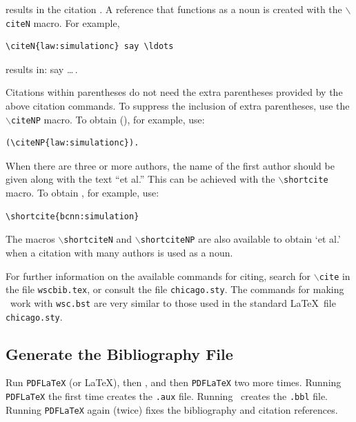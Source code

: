 \documentclass{article}
\begin{document}
\noindent results in the citation \cite{cheng:input94,law:simulationc}. A reference that functions as a noun is created with the {\tt $\backslash$citeN}
macro. For example,\newline


\begin{verbatim}
\citeN{law:simulationc} say \ldots
\end{verbatim}\vspace{5mm}

\noindent results in:  say \ldots\,.

Citations within parentheses do not need the extra parentheses provided by the above citation commands. To suppress the inclusion of extra parentheses, use the {\tt $\backslash$citeNP} macro. To obtain (), for example, use:\newline


\begin{verbatim}
(\citeNP{law:simulationc}).
\end{verbatim}\vspace{5mm}

When there are three or more authors, the name of the first author should be given along with the text ``et al.'' This can be achieved with the {\tt $\backslash$shortcite} macro. To obtain , for example, use: \newline


\begin{verbatim}
\shortcite{bcnn:simulation}
\end{verbatim}\vspace{5mm}

\noindent The macros {\tt $\backslash$shortciteN} and {\tt $\backslash$shortciteNP} are also available to obtain `et al.' when a citation with many authors is used as a noun.

For further information on the available commands for citing, search for {\tt $\backslash$cite} in the file {\tt wscbib.tex}, or consult the file {\tt chicago.sty}. The commands for making \BibTeX\ work with {\tt wsc.bst} are very similar to those used in the standard \LaTeX\ file {\tt chicago.sty}.

\subsection{Generate the Bibliography File}

Run {\tt PDFLaTeX} (or \LaTeX), then \BibTeX, and then {\tt PDFLaTeX} two more times. Running {\tt PDFLaTeX} the first time creates the \texttt{.aux} file. Running \BibTeX\ creates the {\tt .bbl} file. Running {\tt PDFLaTeX} again (twice) fixes the bibliography and citation references.
\end{document}
